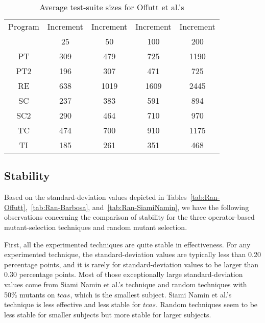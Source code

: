 \begin{table}[t]
\caption{\label{tab:TestSuiteSize} Average test-suite sizes for
Offutt et al.'s} \centering \hspace*{-0.3cm}
\begin{tabular}{|c|c|c|c|c|}
  \hline
  Program & Increment  &Increment  & Increment &Increment \\
  ~ & 25  &50  & 100 &200 \\
   \hline
  \hline
  PT&309 &479 &725 &1190\\
  \hline
  PT2&196 &307 &471 &725\\
  \hline
  RE&638 &1019 &1609 &2445\\
  \hline
  SC&237 &383 &591 &894\\
  \hline
  SC2&290 &464 &710 &970\\
  \hline
  TC&474 &700 &910 &1175\\
  \hline
  TI&185 &261 &351 &468\\
  \hline
\end{tabular}
\vspace{-4ex}
\end{table}

\vspace{-1.5ex}
\subsection{Stability}
\label{Stability}

Based on the standard-deviation values depicted in
Tables~\ref{tab:Ran-Offutt},~\ref{tab:Ran-Barbosa},
and~\ref{tab:Ran-SiamiNamin}, we have the following observations
concerning the comparison of stability for the three
operator-based mutant-selection techniques and random mutant
selection.

First, all the experimented techniques are quite stable in
effectiveness. For any experimented technique, the
standard-deviation values are typically less than 0.20 percentage
points, and it is rarely for standard-deviation values to be
larger than 0.30 percentage points. Most of those exceptionally
large standard-deviation values come from Siami Namin et al.'s
technique and random techniques with 50\% mutants on $tcas$, which
is the smallest subject. Siami Namin et al.'s technique is less
effective and less stable for $tcas$. Random techniques seem to be
less stable for smaller subjects but more stable for larger
subjects.

